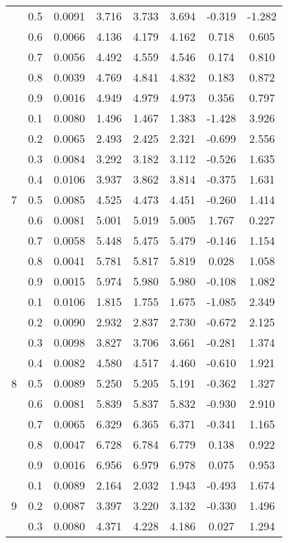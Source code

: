 \documentclass[11pt,a4paper]{report}
\begin{document}
\begin{longtable}{ | c | c || c | c | c | c | c | c | }
 & 0.5 & 0.0091 & 3.716 & 3.733 & 3.694 & -0.319 & -1.282 \\
 & 0.6 & 0.0066 & 4.136 & 4.179 & 4.162 & 0.718 & 0.605 \\
 & 0.7 & 0.0056 & 4.492 & 4.559 & 4.546 & 0.174 & 0.810 \\
 & 0.8 & 0.0039 & 4.769 & 4.841 & 4.832 & 0.183 & 0.872 \\
 & 0.9 & 0.0016 & 4.949 & 4.979 & 4.973 & 0.356 & 0.797 \\
 \hline
\multirow{9}{*}{7} & 0.1 & 0.0080 & 1.496 & 1.467 & 1.383 & -1.428 & 3.926 \\
 & 0.2 & 0.0065 & 2.493 & 2.425 & 2.321 & -0.699 & 2.556 \\
 & 0.3 & 0.0084 & 3.292 & 3.182 & 3.112 & -0.526 & 1.635 \\
 & 0.4 & 0.0106 & 3.937 & 3.862 & 3.814 & -0.375 & 1.631 \\
 & 0.5 & 0.0085 & 4.525 & 4.473 & 4.451 & -0.260 & 1.414 \\
 & 0.6 & 0.0081 & 5.001 & 5.019 & 5.005 & 1.767 & 0.227 \\
 & 0.7 & 0.0058 & 5.448 & 5.475 & 5.479 & -0.146 & 1.154 \\
 & 0.8 & 0.0041 & 5.781 & 5.817 & 5.819 & 0.028 & 1.058 \\
 & 0.9 & 0.0015 & 5.974 & 5.980 & 5.980 & -0.108 & 1.082 \\
 \hline
\multirow{9}{*}{8} & 0.1 & 0.0106 & 1.815 & 1.755 & 1.675 & -1.085 & 2.349 \\
 & 0.2 & 0.0090 & 2.932 & 2.837 & 2.730 & -0.672 & 2.125 \\
 & 0.3 & 0.0098 & 3.827 & 3.706 & 3.661 & -0.281 & 1.374 \\
 & 0.4 & 0.0082 & 4.580 & 4.517 & 4.460 & -0.610 & 1.921 \\
 & 0.5 & 0.0089 & 5.250 & 5.205 & 5.191 & -0.362 & 1.327 \\
 & 0.6 & 0.0081 & 5.839 & 5.837 & 5.832 & -0.930 & 2.910 \\
 & 0.7 & 0.0065 & 6.329 & 6.365 & 6.371 & -0.341 & 1.165 \\
 & 0.8 & 0.0047 & 6.728 & 6.784 & 6.779 & 0.138 & 0.922 \\
 & 0.9 & 0.0016 & 6.956 & 6.979 & 6.978 & 0.075 & 0.953 \\
 \hline
\multirow{9}{*}{9} & 0.1 & 0.0089 & 2.164 & 2.032 & 1.943 & -0.493 & 1.674 \\
 & 0.2 & 0.0087 & 3.397 & 3.220 & 3.132 & -0.330 & 1.496 \\
 & 0.3 & 0.0080 & 4.371 & 4.228 & 4.186 & 0.027 & 1.294 \\

\end{longtable}
\end{document}

